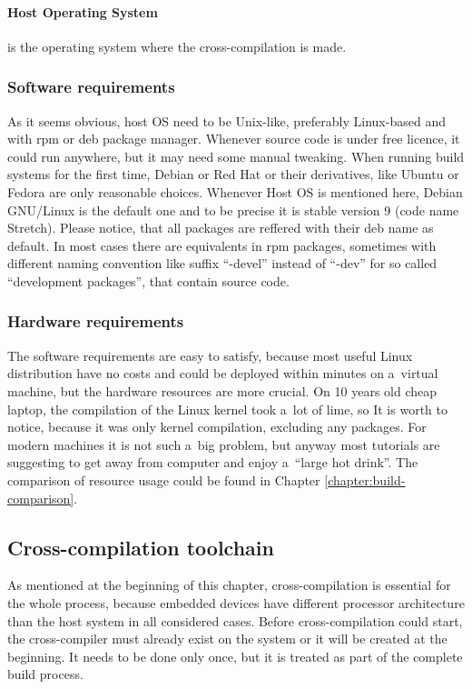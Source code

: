 \documentclass[printmode]{mgr}
\begin{document}
\paragraph{Host Operating System} is the operating system where the cross-compilation is made.

\subsubsection{Software requirements}
As it seems obvious, host OS need to be Unix-like, preferably Linux-based and with rpm or deb package manager. Whenever source code is under free licence, it could run anywhere, but it may need some manual tweaking. When running build systems for the first time, Debian or Red Hat or their derivatives, like Ubuntu or Fedora are only reasonable choices. Whenever Host OS is mentioned here, Debian GNU/Linux is the default one and to be precise it is stable version 9 (code name Stretch). Please notice, that all packages are reffered with their deb name as default. In most cases there are equivalents in rpm packages, sometimes with different naming convention like suffix ``-devel'' instead of ``-dev'' for so called ``development packages'', that contain source code.

\subsubsection{Hardware requirements}
The software requirements are easy to satisfy, because most useful Linux distribution have no costs and could be deployed within minutes on a~virtual machine, but the hardware resources are more crucial. On 10 years old cheap laptop, the compilation of the Linux kernel took a~lot of lime, so It is worth to notice, because it was only kernel compilation, excluding any packages. For modern machines it is not such a~big problem, but anyway most tutorials are suggesting to get away from computer and enjoy a~``large hot drink''. The comparison of resource usage could be found in Chapter \ref{chapter:build-comparison}.

\subsection{Cross-compilation toolchain}

As mentioned at the beginning of this chapter, cross-compilation is essential for the whole process, because embedded devices have different processor architecture than the host system in all considered cases. Before cross-compilation could start, the cross-compiler must already exist on the system or it will be created at the beginning. It needs to be done only once, but it is treated as part of the complete build process.
\end{document}

